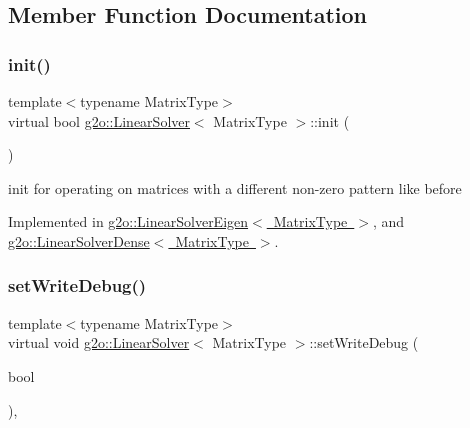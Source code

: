 \subsection{Member Function Documentation}
\mbox{\label{classg2o_1_1_linear_solver_aebd961a94ef6de1bc66d2ca41dd2b17b}} 
\subsubsection{\texorpdfstring{init()}{init()}}
{\footnotesize\ttfamily template$<$typename Matrix\+Type$>$ \\
virtual bool \mbox{\hyperlink{classg2o_1_1_linear_solver}{g2o\+::\+Linear\+Solver}}$<$ Matrix\+Type $>$\+::init (\begin{DoxyParamCaption}{ }\end{DoxyParamCaption})\hspace{0.3cm}{\ttfamily [pure virtual]}}

init for operating on matrices with a different non-\/zero pattern like before 

Implemented in \mbox{\hyperlink{classg2o_1_1_linear_solver_eigen_a8fca4bb987dcbeb94a366b1532dee139}{g2o\+::\+Linear\+Solver\+Eigen$<$ Matrix\+Type $>$}}, and \mbox{\hyperlink{classg2o_1_1_linear_solver_dense_a24f68ecd4b022269dbfc4d990eb5c57b}{g2o\+::\+Linear\+Solver\+Dense$<$ Matrix\+Type $>$}}.

\mbox{\label{classg2o_1_1_linear_solver_a969c406ccacc38705b2a88f5ed23cb9a}} 
\subsubsection{\texorpdfstring{set\+Write\+Debug()}{setWriteDebug()}}
{\footnotesize\ttfamily template$<$typename Matrix\+Type$>$ \\
virtual void \mbox{\hyperlink{classg2o_1_1_linear_solver}{g2o\+::\+Linear\+Solver}}$<$ Matrix\+Type $>$\+::set\+Write\+Debug (\begin{DoxyParamCaption}\item[{bool}]{ }\end{DoxyParamCaption})\hspace{0.3cm}{\ttfamily [inline]}, {\ttfamily [virtual]}}



